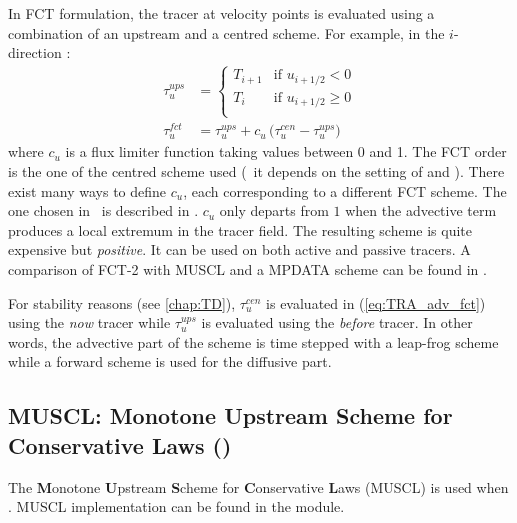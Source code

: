 \documentclass[../main/NEMO_manual]{subfiles}
\begin{document}
In FCT formulation, the tracer at velocity points is evaluated using
a combination of an upstream and a centred scheme.
For example, in the $i$-direction :
\begin{equation}
  \label{eq:TRA_adv_fct}
  \begin{split}
    \tau_u^{ups} &=
    \begin{cases}
                     T_{i + 1} & \text{if~} u_{i + 1/2} <    0 \\
                     T_i       & \text{if~} u_{i + 1/2} \geq 0 \\
    \end{cases} \\
    \tau_u^{fct} &= \tau_u^{ups} + c_u \, \big( \tau_u^{cen} - \tau_u^{ups} \big)
  \end{split}
\end{equation}
where $c_u$ is a flux limiter function taking values between 0 and 1.
The FCT order is the one of the centred scheme used
(\ie\ it depends on the setting of  and ).
There exist many ways to define $c_u$, each corresponding to a different FCT scheme.
The one chosen in \NEMO\ is described in \citet{zalesak_JCP79}.
$c_u$ only departs from $1$ when the advective term produces a local extremum in the tracer field.
The resulting scheme is quite expensive but \textit{positive}.
It can be used on both active and passive tracers.
A comparison of FCT-2 with MUSCL and a MPDATA scheme can be found in \citet{levy.estublier.ea_GRL01}.

For stability reasons (see \autoref{chap:TD}),
$\tau_u^{cen}$ is evaluated in (\autoref{eq:TRA_adv_fct}) using the \textit{now} tracer while
$\tau_u^{ups}$ is evaluated using the \textit{before} tracer.
In other words, the advective part of the scheme is time stepped with a leap-frog scheme while
a forward scheme is used for the diffusive part.

\subsection[MUSCL: Monotone Upstream Scheme for Conservative Laws (\forcode{ln_traadv_mus})]{MUSCL: Monotone Upstream Scheme for Conservative Laws (\protect{})}
\label{subsec:TRA_adv_mus}

The \textbf{M}onotone \textbf{U}pstream \textbf{S}cheme for \textbf{C}onservative \textbf{L}aws
(MUSCL) is used when .
MUSCL implementation can be found in the  module.
\end{document}
